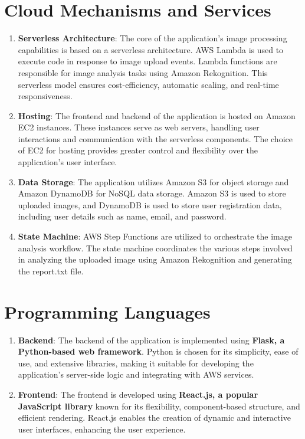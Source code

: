\section{Cloud Mechanisms and Services}
\begin{enumerate}
    \item \textbf{Serverless Architecture}: The core of the application's image processing capabilities is based on a serverless architecture. AWS Lambda is used to execute code in response to image upload events. Lambda functions are responsible for image analysis tasks using Amazon Rekognition. This serverless model ensures cost-efficiency, automatic scaling, and real-time responsiveness.

    \item \textbf{Hosting}: The frontend and backend of the application is hosted on Amazon EC2 instances. These instances serve as web servers, handling user interactions and communication with the serverless components. The choice of EC2 for hosting provides greater control and flexibility over the application's user interface.

    \item \textbf{Data Storage}: The application utilizes Amazon S3 for object storage and Amazon DynamoDB for NoSQL data storage. Amazon S3 is used to store uploaded images, and DynamoDB is used to store user registration data, including user details such as name, email, and password.

    \item \textbf{State Machine}: AWS Step Functions are utilized to orchestrate the image analysis workflow. The state machine coordinates the various steps involved in analyzing the uploaded image using Amazon Rekognition and generating the report.txt file.

    
\end{enumerate}

\section{Programming Languages}
\begin{enumerate}
    \item \textbf{Backend}: The backend of the application is implemented using \textbf{Flask, a Python-based web framework}. Python is chosen for its simplicity, ease of use, and extensive libraries, making it suitable for developing the application's server-side logic and integrating with AWS services.

    \item \textbf{Frontend}: The frontend is developed using \textbf{React.js, a popular JavaScript library} known for its flexibility, component-based structure, and efficient rendering. React.js enables the creation of dynamic and interactive user interfaces, enhancing the user experience.
\end{enumerate}

